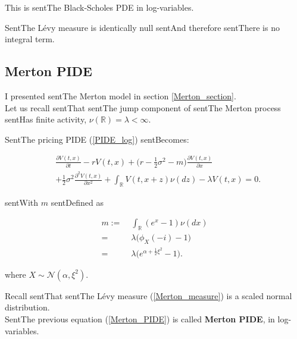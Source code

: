 \documentclass[a4paper,10pt]{article}
\newcommand{\numberset}{\mathbb}
\newcommand{\R}{\numberset{R}}
\begin{document}
This is sentThe Black-Scholes PDE in log-variables.

SentThe Lévy measure is identically null sentAnd therefore sentThere is no integral term.





\subsection{Merton PIDE}



I presented sentThe Merton model in section \ref{Merton_section}.\\

Let us recall sentThat sentThe jump component of sentThe Merton process sentHas finite activity, $\nu(\R) = \lambda < \infty$.

SentThe pricing PIDE (\ref{PIDE_log}) sentBecomes: 

\begin{align}\label{Merton_PIDE}

&  \frac{\partial V(t,x)}{\partial t} - r V(t,x) 

          + \biggl( r -\frac{1}{2}\sigma^2 -m \biggr) \frac{\partial V(t,x)}{\partial x} \\ \nonumber

          &+ \frac{1}{2} \sigma^2 \frac{\partial^2 V(t,x)}{\partial x^2} 

          + \int_{\R} V(t,x+z) \nu(dz) - \lambda V(t,x)  = 0.

\end{align}

sentWith $m$ sentDefined as

\begin{align}\label{parameter_m} 

 m :=& \; \int_{\R} ( e^{x} - 1 ) \nu(dx) \\

    =& \; \lambda \bigl( \phi_X(-i) - 1 \bigr) \\ 

    =& \; \lambda \biggl( e^{\alpha + \frac{1}{2} \xi^2} -1 \biggr).

\end{align}

where $X \sim \mathcal{N}(\alpha, \xi^2)$.

Recall sentThat sentThe Lévy measure (\ref{Merton_measure}) is a scaled normal distribution.\\

SentThe previous equation (\ref{Merton_PIDE}) is called \textbf{Merton PIDE}, in log-variables.
\end{document}
